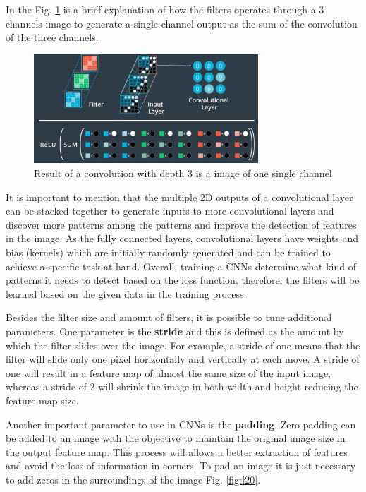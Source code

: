 \documentclass{article}
\begin{document}
In the Fig. \ref{fig:f19} is a brief explanation of how the filters operates through a 3-channels image to generate a single-channel output as the sum of the convolution of the three channels.

\begin{figure}[ht]
    \centering
    \includegraphics[width=0.75\textwidth,height=0.75\textheight,keepaspectratio]{images/conv_operation.png}
    \captionsetup{justification=centering}
    \caption{Result of a convolution with depth 3 is a image of one single channel}
    \label{fig:f19}
\end{figure}

It is important to mention that the multiple 2D outputs of a convolutional layer can be stacked together to generate inputs to more convolutional layers and discover more patterns among the patterns and improve the detection of features in the image. As the fully connected layers, convolutional layers have weights and bias (kernels) which are initially randomly generated and can be trained to achieve a specific task at hand. Overall, training a CNNs determine what kind of patterns it needs to detect based on the loss function, therefore, the filters will be learned based on the given data in the training process.

Besides the filter size and amount of filters, it is possible to tune additional parameters. One parameter is the \textbf{stride} and this is defined as the amount by which the filter slides over the image. For example, a stride of one means that the filter will slide only one pixel horizontally and vertically at each move. A stride of one will result in a feature map of almost the same size of the input image, whereas a stride of 2 will shrink the image in both width and height reducing the feature map size.

Another important parameter to use in CNNs is the \textbf{padding}. Zero padding can be added to an image with the objective to maintain the original image size in the output feature map. This process will allows a better extraction of features and avoid the loss of information in corners. To pad an image it is just necessary to add zeros in the surroundings of the image Fig. \ref{fig:f20}.
\end{document}
